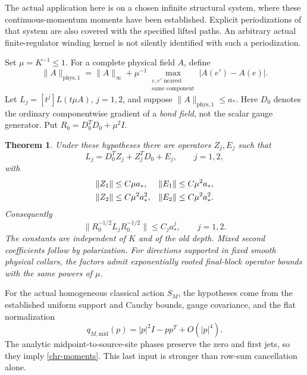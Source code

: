\documentclass[11pt]{article}
\newtheorem{theorem}{Theorem}[section]
\theoremstyle{remark}
\begin{document}
The actual application here is on a chosen infinite structural system,
where these continuous-momentum moments have been established.
Explicit periodizations of that system are also covered with the
specified lifted paths.  An arbitrary actual finite-regulator winding
kernel is not silently identified with such a periodization.

Set \(\mu=K^{-1}\leq1\).  For a complete physical field \(A\), define
\begin{equation}
 \|A\|_{\mathrm{phys},1}
 =\|A\|_\infty+
   \mu^{-1}\max_{\substack{e,e'\text{ nearest}\\
                          \text{same component}}}
                     |A(e')-A(e)| .
 \label{chr-physical-norm}
\end{equation}
Let \(L_j=[t^j]L(t\mu A)\), \(j=1,2\), and suppose
\(\|A\|_{\mathrm{phys},1}\leq a_*\).
Here \(D_0\) denotes the ordinary componentwise gradient of a
\emph{bond field}, not the scalar gauge generator.  Put
\(R_0=D_0^TD_0+\mu^2I\).

\begin{theorem}
\label{chr-main}
Under these hypotheses there are operators \(Z_j,E_j\) such that
\begin{equation}
 L_j=D_0^TZ_j+Z_j^TD_0+E_j,\qquad j=1,2,
 \label{chr-decomposition}
\end{equation}
with
\begin{align}
 \|Z_1\|&\leq C\mu a_*,
 &\|E_1\|&\leq C\mu^2a_*,
 \notag\\
 \|Z_2\|&\leq C\mu^2a_*^2,
 &\|E_2\|&\leq C\mu^2a_*^2 .
 \label{chr-bounds}
\end{align}
Consequently
\begin{equation}
 \|R_0^{-1/2}L_jR_0^{-1/2}\|
       \leq C_j a_*^j,\qquad j=1,2.
 \label{chr-relative}
\end{equation}
The constants are independent of \(K\) and of the old depth.
Mixed second coefficients follow by polarization.  For directions
supported in fixed smooth physical collars, the factors admit
exponentially rooted final-block operator bounds with the same
powers of \(\mu\).
\end{theorem}

For the actual homogeneous classical action \(S_M\), the hypotheses
come from the established uniform support and Cauchy bounds, gauge
covariance, and the flat normalization
\[
 q_{M,\mathrm{mid}}(p)=|p|^2I-pp^T+O(|p|^4).
\]
The analytic midpoint-to-source-site phases preserve the zero and
first jets, so they imply \eqref{chr-moments}.  This last input is
stronger than row-sum cancellation alone.
\end{document}
